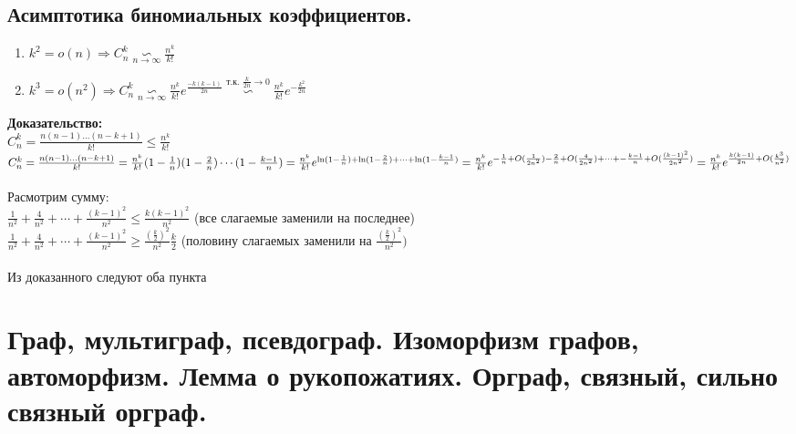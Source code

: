 \documentclass[12pt]{article}
\begin{document}
\subsection{Асимптотика биномиальных коэффициентов.}
\begin{enumerate}
	\item $k^2 = o(n) \Rightarrow C_n^k \underset{n\to\infty}{\backsim} \frac{n^k}{k!}$
	\item $k^3 = o(n^2) \Rightarrow C_n^k \underset{n\to\infty}{\backsim} \frac{n^k}{k!}e^{\frac{-k(k-1)}{2n}} \overset{\text{т.к. $\frac{k}{2n} \to 0$}}{\backsim} \frac{n^k}{k!}e^{-\frac{k^2}{2n}}$
\end{enumerate}
	\textbf{Доказательство:}\\
		$C_n^k = \frac{n(n-1)\dotsc(n-k+1)}{k!} \leqslant \frac{n^k}{k!}$\\
		$C_n^k = \frac{n(n-1)\dotsc(n-k+1)}{k!} = \frac{n^k}{k!}(1-\frac{1}{n})(1-\frac{2}{n})\dotsm(1-\frac{k-1}{n}) = 
		\frac{n^k}{k!}e^{\ln(1-\frac{1}{n}) + \ln(1 - \frac{2}{n}) + \dotsb + \ln(1 - \frac{k-1}{n})} =\\
		\frac{n^k}{k!}e^{-\frac{1}{n} + O(\frac{1}{2n^2}) - \frac{2}{n} + O(\frac{4}{2n^2}) + \dotsb + -\frac{k-1}{n} + O(\frac{(k-1)^2}{2n^2})} =
		\frac{n^k}{k!}e^{\frac{k(k-1)}{2n} + O(\frac{k^3}{n^2})}$\\\\

		Расмотрим сумму:\\
		$\frac{1}{n^2} + \frac{4}{n^2} + \dotsb + \frac{(k-1)^2}{n^2} \leqslant \frac{k(k-1)^2}{n^2}$ \quad (все слагаемые заменили на последнее)\\
		$\frac{1}{n^2} + \frac{4}{n^2} + \dotsb + \frac{(k-1)^2}{n^2} \geqslant \frac{(\frac{k}{2})^2}{n^2}\frac{k}{2}$ \quad (половину слагаемых заменили на $\frac{(\frac{k}{2})^2}{n^2})$\\\\
		Из доказанного следуют оба пункта\\
	\qedsymbol

\section{Граф, мультиграф, псевдограф. Изоморфизм графов, автоморфизм. Лемма о рукопожатиях. Орграф, связный, сильно связный орграф.}
\end{document}
